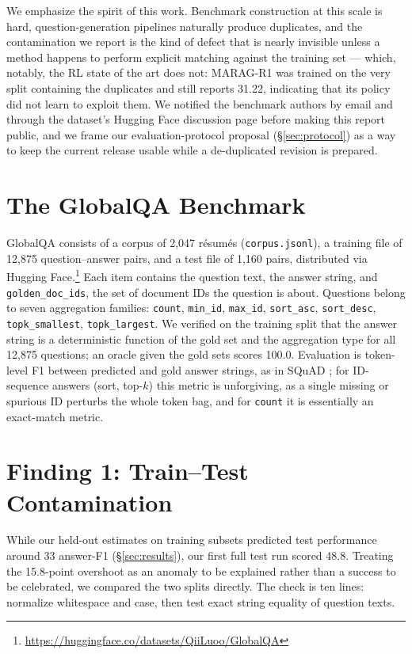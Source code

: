 \documentclass[11pt]{article}
\begin{document}
We emphasize the spirit of this work. Benchmark construction at this scale is hard, question-generation pipelines naturally produce duplicates, and the contamination we report is the kind of defect that is nearly invisible unless a method happens to perform explicit matching against the training set --- which, notably, the RL state of the art does not: MARAG-R1 was trained on the very split containing the duplicates and still reports 31.22, indicating that its policy did not learn to exploit them. We notified the benchmark authors by email and through the dataset's Hugging Face discussion page before making this report public, and we frame our evaluation-protocol proposal (\S\ref{sec:protocol}) as a way to keep the current release usable while a de-duplicated revision is prepared.

\section{The GlobalQA Benchmark}
\label{sec:background}

GlobalQA \cite{globalqa} consists of a corpus of 2{,}047 r\'esum\'es (\texttt{corpus.jsonl}), a training file of 12{,}875 question--answer pairs, and a test file of 1{,}160 pairs, distributed via Hugging Face.\footnote{\url{https://huggingface.co/datasets/QiiLuoo/GlobalQA}} Each item contains the question text, the answer string, and \texttt{golden\_doc\_ids}, the set of document IDs the question is about. Questions belong to seven aggregation families: \texttt{count}, \texttt{min\_id}, \texttt{max\_id}, \texttt{sort\_asc}, \texttt{sort\_desc}, \texttt{topk\_smallest}, \texttt{topk\_largest}. We verified on the training split that the answer string is a deterministic function of the gold set and the aggregation type for all 12{,}875 questions; an oracle given the gold sets scores 100.0. Evaluation is token-level F1 between predicted and gold answer strings, as in SQuAD \cite{squad}; for ID-sequence answers (sort, top-$k$) this metric is unforgiving, as a single missing or spurious ID perturbs the whole token bag, and for \texttt{count} it is essentially an exact-match metric.

\section{Finding 1: Train--Test Contamination}
\label{sec:contamination}

While our held-out estimates on training subsets predicted test performance around 33 answer-F1 (\S\ref{sec:results}), our first full test run scored 48.8. Treating the 15.8-point overshoot as an anomaly to be explained rather than a success to be celebrated, we compared the two splits directly. The check is ten lines: normalize whitespace and case, then test exact string equality of question texts.
\end{document}

